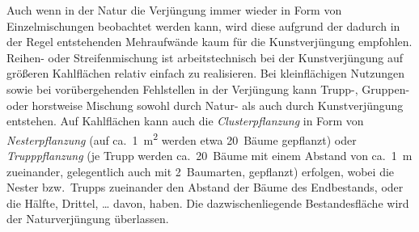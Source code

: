 \documentclass[twocolumn, paper=a4, fontsize=10pt, bibliography=totoc, index=totoc]{scrartcl}
\begin{document}
Auch wenn in der Natur die Verjüngung immer wieder in Form von Einzelmischungen
beobachtet werden kann, wird diese aufgrund der dadurch in der Regel
entstehenden Mehraufwände kaum für die Kunstverjüngung empfohlen. Reihen- oder
Streifenmischung ist arbeitstechnisch bei der Kunstverjüngung auf größeren
Kahlflächen relativ einfach zu realisieren. Bei kleinflächigen Nutzungen sowie
bei vorübergehenden Fehlstellen in der Verjüngung kann Trupp-, Gruppen- oder
horstweise Mischung sowohl durch Natur- als auch durch Kunstverjüngung
entstehen. Auf Kahlflächen kann auch die \emph{Clusterpflanzung} in Form von
\emph{Nesterpflanzung} (auf ca.\ \qty{1}{\square\metre} werden etwa 20~Bäume gepflanzt) oder
\emph{Trupppflanzung} (je Trupp werden ca.\ 20~Bäume mit einem Abstand von ca.\
\qty{1}{\metre} zueinander, gelegentlich auch mit 2~Baumarten, gepflanzt) erfolgen, wobei
die Nester bzw.\ Trupps zueinander den Abstand der Bäume des Endbestands, oder
die Hälfte, Drittel, \dots{} davon, haben. Die dazwischenliegende Bestandesfläche
wird der Naturverjüngung überlassen.
\end{document}
